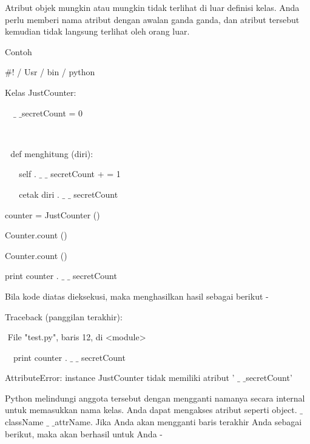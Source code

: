 \documentclass[a4paper,12pt]{report}
\begin{document}
\vspace{12pt}
\noindent 
Atribut objek mungkin atau mungkin tidak terlihat di luar definisi kelas. Anda perlu memberi nama atribut dengan awalan ganda ganda, dan atribut tersebut kemudian tidak langsung terlihat oleh orang luar. \par
\noindent 
Contoh \par
\vspace{12pt}
\noindent 
 $  \#  $! / Usr / bin / python \par
\vspace{12pt}
\noindent 
Kelas JustCounter: \par
\noindent 
 $  $ $  $ $  $ $  \_  $ $  \_  $secretCount = 0 \par
\noindent 
 $  $ $  $ \par
\noindent 
 $  $ $  $ $  $def menghitung (diri): \par
\noindent 
 $  $ $  $ $  $ $  $ $  $ $  $self . $  \_  $ $  \_  $ secretCount + = 1 \par
\noindent 
 $  $ $  $ $  $ $  $ $  $ $  $cetak diri . $  \_  $ $  \_  $ secretCount \par
\vspace{12pt}
\noindent 
counter = JustCounter () \par
\noindent 
Counter.count () \par
\noindent 
Counter.count () \par
\noindent 
print counter . $  \_  $ $  \_  $ secretCount \par
\vspace{12pt}
\noindent 
Bila kode diatas dieksekusi, maka menghasilkan hasil sebagai berikut - \par
\vspace{12pt}
 \par
{} \par
\noindent 
Traceback (panggilan terakhir): \par
\noindent 
 $  $ $  $File "test.py", baris 12, di <module> \par
\noindent 
 $  $ $  $ $  $ $  $print counter . $  \_  $ $  \_  $ secretCount \par
\noindent 
AttributeError: instance JustCounter tidak memiliki atribut ' $  \_  $ $  \_  $secretCount' \par
\vspace{12pt}
\noindent 
Python melindungi anggota tersebut dengan mengganti namanya secara internal untuk memasukkan nama kelas. Anda dapat mengakses atribut seperti object. $  \_  $className $  \_  $ $  \_  $attrName. Jika Anda akan mengganti baris terakhir Anda sebagai berikut, maka akan berhasil untuk Anda - \par
\end{document}
